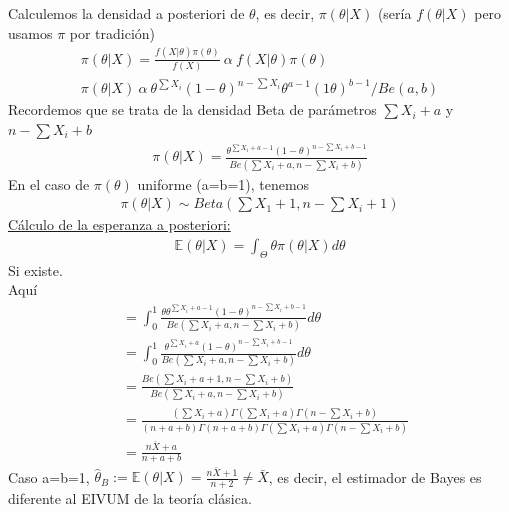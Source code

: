 \documentclass[10pt]{article}
\theoremstyle{plain}
\theoremstyle{definition}
\begin{document}
Calculemos la densidad a posteriori de $\theta$, es decir, $\pi(\theta|X)$ (sería $f(\theta|X)$ pero usamos $\pi$ por tradición)
\begin{align*}
\pi(\theta|X) = \frac{f(X|\theta)\pi(\theta)}{f(X)}\ \alpha\ f(X|\theta)\pi(\theta)\\
\pi(\theta|X)\ \alpha\ \theta^{\sum X_{i}}(1-\theta)^{n-\sum X_{i}} \theta^{a-1}(1\theta)^{b-1}/Be(a,b)
\end{align*}
Recordemos que se trata de la densidad Beta de parámetros $\sum X_{i}+a$ y $n-\sum X_{i} +b$
\begin{align*}
\pi(\theta|X) = \frac{\theta^{\sum X_{i}+a-1}(1-\theta)^{n-\sum X_{i} +b -1}}{Be\left(\sum X_{i}+a,n-\sum X_{i}+b\right)}
\end{align*}
En el caso de $\pi(\theta)$ uniforme (a=b=1), tenemos
\begin{align*}
\pi(\theta|X) \sim Beta\left(\sum X_{1} + 1, n-\sum X_{i}+1\right)
\end{align*}
\underline{Cálculo de la esperanza a posteriori:}
\begin{align*}
\mathbb{E}(\theta|X) = \int_{\Theta}\theta\pi(\theta|X)d\theta
\end{align*}
Si existe.\\
Aquí
\begin{align*}
&= \int_{0}^{1} \frac{\theta\theta^{\sum X_{i}+a-1}(1-\theta)^{n-\sum X_{i} +b - 1}}{Be(\sum X_{i}+a,n-\sum X_{i}+b)}d\theta\\
&= \int_{0}^{1}\frac{\theta^{\sum X_{i} +a}(1-\theta)^{n-\sum X_{i} + b -1}}{Be(\sum X_{i}+a,n-\sum X_{i}+b)}d\theta\\
&= \frac{Be(\sum X_{i} +a +1,n-\sum X_{i} +b)}{Be(\sum X_{i}+a, n-\sum X_{i} +b)}\\
&= \frac{(\sum X_{i}+a)\Gamma(\sum X_{i} + a)\Gamma(n-\sum X_{i} +b)}{(n+a+b)\Gamma(n+a+b)\Gamma(\sum X_{i}+a)\Gamma(n-\sum X_{i} + b)}\\
&= \frac{n\bar{X}+a}{n+a+b}
\end{align*}
Caso a=b=1, $\hat{\theta}_{B} := \mathbb{E}(\theta|X) = \frac{n\bar{X}+1}{n+2} \not = \bar{X}$, es decir, el estimador de Bayes es diferente al EIVUM de la teoría clásica.\\
\end{document}
